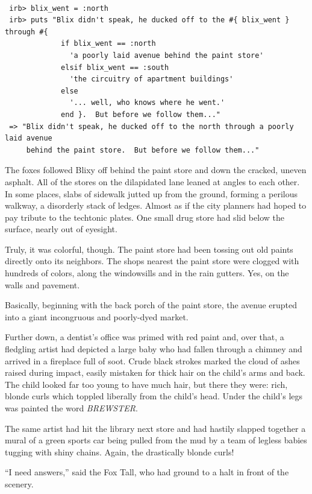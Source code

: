 \documentclass[10pt,twoside]{report}
\begin{document}
\begin{lstlisting}

 irb> blix_went = :north
 irb> puts "Blix didn't speak, he ducked off to the #{ blix_went } through #{
             if blix_went == :north
               'a poorly laid avenue behind the paint store'
             elsif blix_went == :south
               'the circuitry of apartment buildings'
             else
               '... well, who knows where he went.'
             end }.  But before we follow them..."
 => "Blix didn't speak, he ducked off to the north through a poorly laid avenue
     behind the paint store.  But before we follow them..."

\end{lstlisting}


The foxes followed Blixy off behind the paint store and down the
cracked, uneven asphalt. All of the stores on the dilapidated lane
leaned at angles to each other.  In some places, slabs of sidewalk
jutted up from the ground, forming a perilous walkway, a disorderly
stack of ledges.  Almost as if the city planners had hoped to pay
tribute to the techtonic plates.  One small drug store had slid below
the surface, nearly out of eyesight.

Truly, it was colorful, though.  The paint store had been tossing out
old paints directly onto its neighbors.  The shops nearest the paint
store were clogged with hundreds of colors, along the windowsills and
in the rain gutters.  Yes, on the walls and pavement.

Basically, beginning with the back porch of the paint store, the
avenue erupted into a giant incongruous and poorly-dyed market.

Further down, a dentist's office was primed with red paint and, over
that, a fledgling artist had depicted a large baby who had fallen
through a chimney and arrived in a fireplace full of soot. Crude black
strokes marked the cloud of ashes raised during impact, easily
mistaken for thick hair on the child's arms and back.  The child
looked far too young to have much hair, but there they were: rich,
blonde curls which toppled liberally from the child's head.  Under the
child's legs was painted the word {\em BREWSTER}.

The same artist had hit the library next store and had hastily slapped
together a mural of a green sports car being pulled from the mud by a
team of legless babies tugging with shiny chains. Again, the
drastically blonde curls!

``I need answers,'' said the Fox Tall, who had ground to a halt in
front of the scenery.
\end{document}
